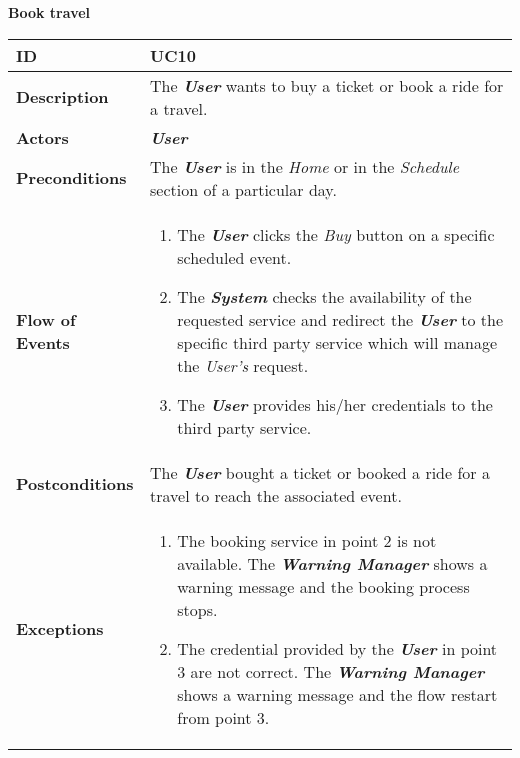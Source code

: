 \begin{center}
	\textbf{Book travel}
\end{center}

\begin{tabularx}{\linewidth}{| l | X |}
	\hline
	\textbf{ID} & UC10\\
	
	\hline
	\textbf{Description} & The \textbf{\textit{User}} wants to buy a ticket or book a ride for a travel.\\
	
	\hline
	\textbf{Actors} & \textbf{\textit{User}}\\
	
	\hline
	\textbf{Preconditions} & The \textbf{\textit{User}} is in the \textit{Home} or in the \textit{Schedule} section of a particular day.\\
	
	\hline
	\textbf{Flow of Events} & \parbox{0.7\textwidth}{\begin{enumerate}
			\item The \textbf{\textit{User}} clicks the \textit{Buy} button on a specific scheduled event.
			\item The \textbf{\textit{System}} checks the availability of the requested service and redirect the \textbf{\textit{User}} to the specific third party service which will manage the \textit{User's} request.
			\item The \textbf{\textit{User}} provides his/her credentials to the third party service.
	\end{enumerate}}\\
	
	\hline
	\textbf{Postconditions} & The \textbf{\textit{User}} bought a ticket or booked a ride for a travel to reach the associated event. \\
	
	\hline
	\textbf{Exceptions} & \parbox{0.7\textwidth}{ \begin{enumerate}
			\item The booking service in point 2 is not available. The \textit{\textbf{Warning Manager}} shows a warning message and the booking process stops.
			\item The credential provided by the \textbf{\textit{User}} in point 3 are not correct. The \textbf{\textit{Warning Manager}} shows a warning message and the flow restart from point 3.
	\end{enumerate}}\\
	\hline
\end{tabularx}


